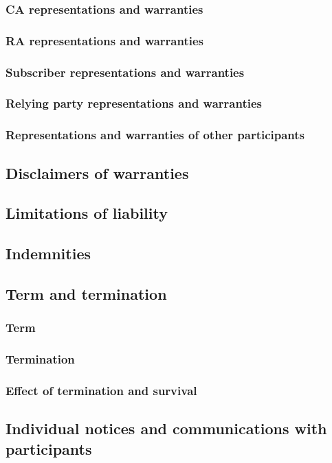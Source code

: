 \documentclass[10pt]{article}
\begin{document}
\subsubsection{CA representations and warranties}
\subsubsection{RA representations and warranties}
\subsubsection{Subscriber representations and warranties}
\subsubsection{Relying party representations and warranties}
\subsubsection{Representations and warranties of other participants}
\subsection{Disclaimers of warranties}
\subsection{Limitations of liability}
\subsection{Indemnities}
\subsection{Term and termination}
\subsubsection{Term}
\subsubsection{Termination}
\subsubsection{Effect of termination and survival}
\subsection{Individual notices and communications with participants}
\end{document}
